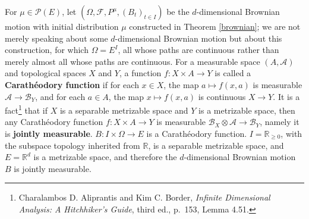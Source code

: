 \documentclass{article}
\theoremstyle{definition}
\begin{document}
For $\mu \in \mathscr{P}(E)$, let
 $(\Omega,\mathscr{F},P^\mu,(B_t)_{t \in I})$ be
the $d$-dimensional Brownian motion with initial distribution $\mu$ constructed in Theorem \ref{brownian}; we are not merely speaking about
some $d$-dimensional Brownian motion but about this construction, for which $\Omega=E^I$, all  whose paths are continuous rather than merely almost all whose paths are continuous. For a measurable space $(A,\mathscr{A})$ and topological spaces $X$ and $Y$, a function
$f:X \times A \to Y$ is called a \textbf{Carath\'eodory function} if for each $x \in X$, the map
$a \mapsto f(x,a)$ is measurable $\mathscr{A} \to \mathscr{B}_Y$, and for
each $a \in A$, the map $x \mapsto f(x,a)$ is continuous $X \to Y$. 
It is a fact\footnote{Charalambos D. Aliprantis
and Kim C. Border, {\em Infinite Dimensional Analysis: A Hitchhiker's Guide}, third ed., 
p.~153, Lemma 4.51.} that if $X$ is a separable metrizable space and $Y$ is a metrizable space, then
any Carath\'eodory function $f:X \times A \to Y$ is measurable
$\mathscr{B}_X \otimes \mathscr{A} \to \mathscr{B}_Y$, namely it is \textbf{jointly measurable}.
$B:I \times \Omega \to E$ is a Carath\'eodory function.
$I=\mathbb{R}_{\geq 0}$, with the subspace topology inherited from $\mathbb{R}$, is a separable metrizable space,
and $E=\mathbb{R}^d$ is a metrizable space, and therefore the $d$-dimensional Brownian motion $B$ is jointly measurable.
\end{document}
